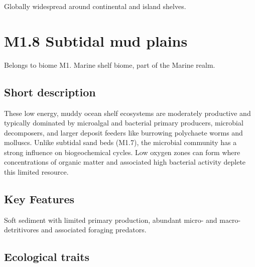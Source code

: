 \documentclass[
  letterpaper,
  DIV=11,
  numbers=noendperiod]{scrartcl}
\begin{document}
Globally widespread around continental and island shelves.

\section{M1.8 Subtidal mud plains}\label{m1.8-subtidal-mud-plains}

Belongs to biome M1. Marine shelf biome, part of the Marine realm.

\subsection{Short description}\label{short-description-33}

These low energy, muddy ocean shelf ecosystems are moderately productive
and typically dominated by microalgal and bacterial primary producers,
microbial decomposers, and larger deposit feeders like burrowing
polychaete worms and molluscs. Unlike subtidal sand beds (M1.7), the
microbial community has a strong influence on biogeochemical cycles. Low
oxygen zones can form where concentrations of organic matter and
associated high bacterial activity deplete this limited resource.

\subsection{Key Features}\label{key-features-33}

Soft sediment with limited primary production, abundant micro- and
macro-detritivores and associated foraging predators.

\subsection{Ecological traits}\label{ecological-traits-33}
\end{document}
